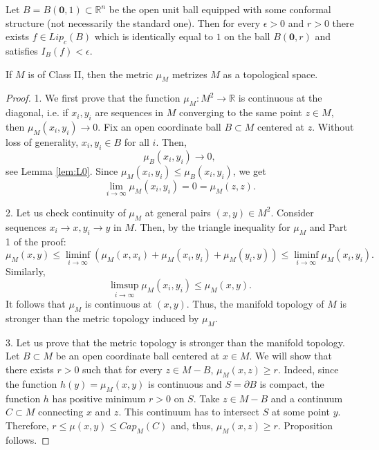 \documentclass[10pt,a4paper]{amsart}
\def\R{\mathbb R}
\def\eps{\epsilon}
\begin{document}
\begin{lem}\label{lem:L0}
Let $B=B(\mathbf 0, 1)\subset \R^n$ be the open unit ball equipped with some conformal structure (not necessarily the standard one). 
Then for every $\eps>0$ and $r>0$ there exists 
$f\in Lip_c(B)$ which is identically equal to $1$ on the ball $B(\mathbf 0, r)$ and satisfies $I_B(f)<\eps$.  
\end{lem}

\begin{prop}
If $M$ is of Class II, then the metric $\mu_M$ metrizes $M$ as a topological space. 
\end{prop}

\begin{proof} 1. We first prove that the function $\mu_M: M^2\to \R$ is continuous at the diagonal, i.e. if $x_i, y_i$ are sequences in $M$ converging to the same point 
$z\in M$, then $\mu_M(x_i, y_i)\to 0$. Fix an open coordinate  ball $B\subset M$ centered at $z$. Without loss of generality, 
$x_i, y_i\in B$ for all $i$. Then,  
$$
\mu_B(x_i,y_i)\to 0,
$$
see Lemma \ref{lem:L0}. Since $\mu_M(x_i,y_i)\le \mu_B(x_i,y_i)$, we get 
$$
\lim_{i\to\infty} \mu_M(x_i,y_i)= 0= \mu_M(z,z). 
$$ 

2. Let us check continuity of $\mu_M$ at general pairs $(x,y)\in M^2$. Consider sequences $x_i\to x, y_i\to y$ in $M$. 
Then, by the triangle inequality for $\mu_M$ and Part 1 of the proof:
$$
\mu_M(x,y)\le \liminf_{i\to\infty} (\mu_M(x, x_i) + \mu_M(x_i, y_i) + \mu_M(y_i,y))\le   \liminf_{i\to\infty}  \mu_M(x_i, y_i). 
$$ 
Similarly, 
$$
\limsup_{i\to\infty} \mu_M(x_i, y_i)\le \mu_M(x,y). 
$$
It follows that $\mu_M$ is continuous at $(x,y)$. Thus, the manifold topology of $M$ is stronger than the metric topology induced by $\mu_M$. 

3. Let us prove that the metric topology is stronger than the manifold topology. 
Let $B\subset M$ be an open coordinate ball centered at $x\in M$. We will show that there exists $r>0$ such that for every $z\in M- {B}$, $\mu_M(x,z)\ge r$. 
Indeed, since the function $h(y)=\mu_M(x,y)$ is continuous and $S=\partial B$ is compact, the function $h$ has positive minimum $r>0$  on $S$. Take $z\in M- B$ 
and a continuum $C\subset M$ connecting $x$ and $z$. This continuum has to intersect $S$ at some point $y$. Therefore, $r\le \mu(x,y)\le Cap_M(C)$ and, thus,  
$\mu_M(x,z)\ge r$. Proposition follows. 
\end{proof}
\end{document}
